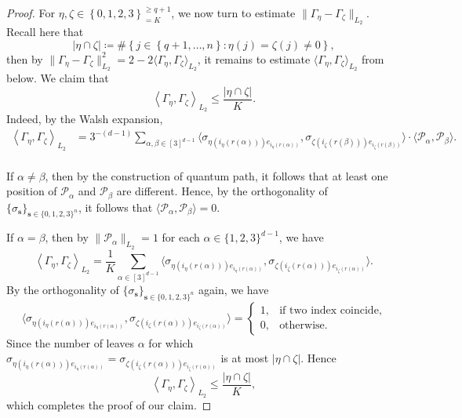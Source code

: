 \documentclass{amsbook}
\theoremstyle{definition}
\theoremstyle{remark}
\numberwithin{section}{chapter}
\numberwithin{equation}{chapter}
\newcommand{\1}{\mathbf{1}}
\begin{document}
\begin{proof}
For $\eta,\zeta\in\left\{0,1,2,3\right\}^{\geq q+1}_{=K}$, we now turn to estimate $\|\Gamma_\eta-\Gamma_\zeta\|_{L_{2}}$. Recall here that
\[
|\eta\cap\zeta|\coloneqq\#\left\{j\in\left\{q+1,\dots,n\right\}:\eta(j)=\zeta(j)\neq0\right\},
\]
then by $\|\Gamma_{\eta}-\Gamma_{\zeta}\|^{2}_{L_{2}}=2-2\langle \Gamma_{\eta},\Gamma_{\zeta}\rangle_{L_2}$, it remains to estimate $\langle \Gamma_{\eta},\Gamma_{\zeta}\rangle_{L_2}$ from below. We claim that
\[
\left\langle\Gamma_{\eta},\Gamma_{\zeta}\right\rangle_{L_{2}}
\leq\frac{|\eta\cap\zeta|}{K}.
\]
Indeed, by the Walsh expansion,
\[
\begin{split}
\left\langle\Gamma_{\eta},\Gamma_{\zeta}\right\rangle_{L_{2}}&=3^{-(d-1)}\sum_{\alpha,\beta\in[3]^{d-1}}\langle \sigma_{\eta(i_{\eta}(r(\alpha)))e_{i_{\eta}(r(\alpha))}},\sigma_{\zeta(i_{\zeta}(r(\beta)))e_{i_{\zeta}(r(\beta))}}\rangle\cdot\langle \mathcal{P}_{\alpha},\mathcal{P}_{\beta}\rangle.\\
\end{split}
\]

If $\alpha\neq\beta$, then by the construction of quantum path, it follows that at least one position of $\mathcal{P}_{\alpha}$ and $\mathcal{P}_{\beta}$ are different. Hence, by the orthogonality of $\{\sigma_{\mathbf{s}}\}_{\mathbf{s}\in\{0,1,2,3\}^{n}}$, it follows that $\langle \mathcal{P}_{\alpha},\mathcal{P}_{\beta}\rangle=0$.

If $\alpha=\beta$, then by $\|\mathcal{P}_{\alpha}\|_{L_{2}}=1$ for each $\alpha\in \{1,2,3\}^{d-1}$, we have
\[
\left\langle\Gamma_{\eta},\Gamma_{\zeta}\right\rangle_{L_{2}}=\frac{1}{K}\sum_{\alpha\in[3]^{d-1}}\langle \sigma_{\eta(i_{\eta}(r(\alpha)))e_{i_{\eta}(r(\alpha))}},\sigma_{\zeta(i_{\zeta}(r(\alpha)))e_{i_{\zeta}(r(\alpha))}}\rangle.
\]
By the orthogonality of $\{\sigma_{\mathbf{s}}\}_{\mathbf{s}\in\{0,1,2,3\}^{n}}$ again, we have
\[
\langle\sigma_{\eta(i_{\eta}(r(\alpha)))e_{i_{\eta}(r(\alpha))}},\sigma_{\zeta(i_{\zeta}(r(\alpha)))e_{i_{\zeta}(r(\alpha))}}\rangle=
\begin{cases}
1,&\mbox{if two index coincide},\\
0,&\mbox{otherwise}.
\end{cases}
\]
Since the number of leaves $\alpha$ for which $\sigma_{\eta(i_{\eta}(r(\alpha)))e_{i_{\eta}(r(\alpha))}}=\sigma_{\zeta(i_{\zeta}(r(\alpha)))e_{i_{\zeta}(r(\alpha))}}$ is at most $|\eta\cap\zeta|$.
Hence
\[
\left\langle\Gamma_{\eta},\Gamma_{\zeta}\right\rangle_{L_{2}}\leq\frac{|\eta\cap\zeta|}{K},
\]
which completes the proof of our claim.


\end{proof}
\end{document}
